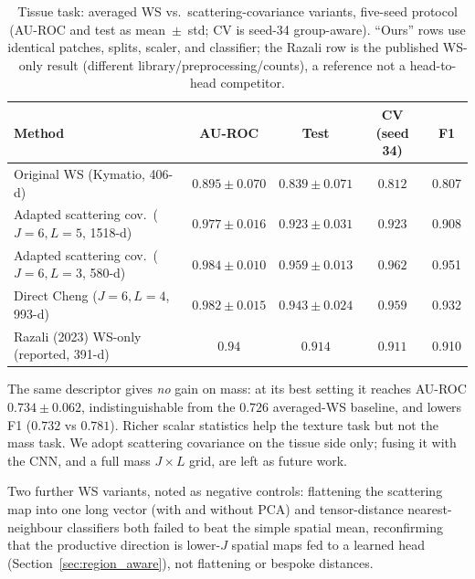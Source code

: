 \begin{table}[H]
\centering
\caption[Tissue task: averaged WS versus scattering-covariance variants]{Tissue task: averaged WS vs.\ scattering-covariance variants, five-seed protocol (AU-ROC and test as mean~$\pm$~std; CV is seed-34 group-aware). ``Ours'' rows use identical patches, splits, scaler, and classifier; the Razali row is the published WS-only result (different library/preprocessing/counts), a reference not a head-to-head competitor.}
\label{tab:scov_tissue_initial}
\begin{tabular}{>{\raggedright\arraybackslash}p{5.0cm}cccc}
\toprule
\textbf{Method} & \textbf{AU-ROC} & \textbf{Test} & \textbf{CV (seed 34)} & \textbf{F1} \\
\midrule
Original WS (Kymatio, 406-d)                        & $0.895 \pm 0.070$ & $0.839 \pm 0.071$ & $0.812$ & 0.807 \\
Adapted scattering cov.\ ($J{=}6, L{=}5$, 1518-d)   & $0.977 \pm 0.016$ & $0.923 \pm 0.031$ & $0.923$ & 0.908 \\
Adapted scattering cov.\ ($J{=}6, L{=}3$, 580-d)    & $0.984 \pm 0.010$ & $0.959 \pm 0.013$ & $0.962$ & 0.951 \\
Direct Cheng ($J{=}6, L{=}4$, 993-d)                & $0.982 \pm 0.015$ & $0.943 \pm 0.024$ & $0.959$ & 0.932 \\
Razali (2023) WS-only (reported, 391-d)             & $0.94$ & $0.914$ & $0.911$ & 0.910 \\
\bottomrule
\end{tabular}
\end{table}

The same descriptor gives \emph{no} gain on mass: at its best setting it reaches AU-ROC $0.734 \pm 0.062$, indistinguishable from the $0.726$ averaged-WS baseline, and lowers F1 ($0.732$ vs $0.781$). Richer scalar statistics help the texture task but not the mass task. We adopt scattering covariance on the tissue side only; fusing it with the CNN, and a full mass $J\times L$ grid, are left as future work.

Two further WS variants, noted as negative controls\label{sec:ws_alternatives}: flattening the scattering map into one long vector (with and without PCA) and tensor-distance nearest-neighbour classifiers both failed to beat the simple spatial mean, reconfirming that the productive direction is lower-$J$ spatial maps fed to a learned head (Section~\ref{sec:region_aware}), not flattening or bespoke distances.


